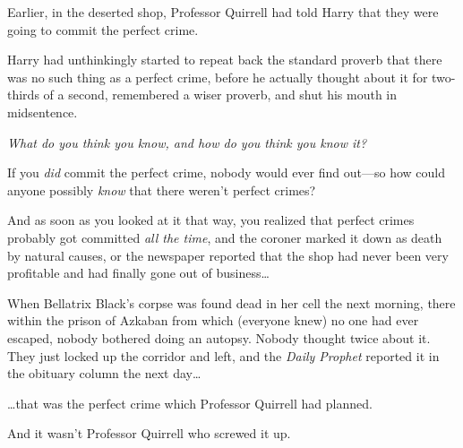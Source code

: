 \later

Earlier, in the deserted shop, Professor Quirrell had told Harry that they were
going to commit the perfect crime.

Harry had unthinkingly started to repeat back the standard proverb that there
was no such thing as a perfect crime, before he actually thought about it for
two-thirds of a second, remembered a wiser proverb, and shut his mouth in
midsentence.

\emph{What do you think you know, and how do you think you know it?}

If you \emph{did} commit the perfect crime, nobody would ever find out—so how
could anyone possibly \emph{know} that there weren’t perfect crimes?

And as soon as you looked at it that way, you realized that perfect crimes
probably got committed \emph{all the time}, and the coroner marked it down as
death by natural causes, or the newspaper reported that the shop had never been
very profitable and had finally gone out of business…

When Bellatrix Black’s corpse was found dead in her cell the next morning,
there within the prison of Azkaban from which (everyone knew) no one had ever
escaped, nobody bothered doing an autopsy. Nobody thought twice about it. They
just locked up the corridor and left, and the \emph{Daily Prophet} reported it
in the obituary column the next day…

…that was the perfect crime which Professor Quirrell had planned.

And it wasn’t Professor Quirrell who screwed it up.
